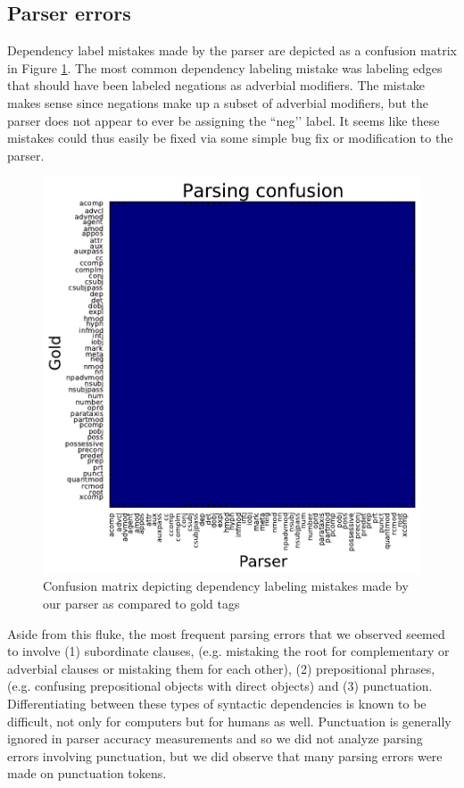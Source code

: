 \documentclass[12pt]{article}
\begin{document}
\subsection{Parser errors}
Dependency label mistakes made by the parser are depicted as a confusion matrix in Figure \ref{parseconfusion}. The most common dependency labeling mistake was labeling edges that should have been labeled negations as adverbial modifiers. The mistake makes sense since negations make up a subset of adverbial modifiers, but the parser does not appear to ever be assigning the ``neg’’ label. It seems like these mistakes could thus easily be fixed via some simple bug fix or modification to the parser. 

\begin{center}
\begin{figure}[!ht]
\includegraphics[scale=1.0]{parse_output.pdf}
\caption{Confusion matrix depicting dependency labeling mistakes made by our parser as compared to gold tags \label{parseconfusion}}
\end{figure}
\end{center}

Aside from this fluke, the most frequent parsing errors that we observed seemed to involve (1) subordinate clauses, (e.g. mistaking the root for complementary or adverbial clauses or mistaking them for each other), (2) prepositional phrases, (e.g. confusing prepositional objects with direct objects) and (3) punctuation. Differentiating between these types of syntactic dependencies is known to be difficult, not only for computers but for humans as well. Punctuation is generally ignored in parser accuracy measurements and so we did not analyze parsing errors involving punctuation, but we did observe that many parsing errors were made on punctuation tokens.
\end{document}
